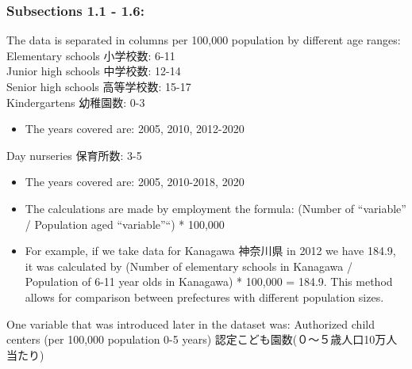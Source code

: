 \documentclass[
  12pt,
  letterpaper,
  DIV=11,
  numbers=noendperiod]{scrartcl}
\providecommand{\tightlist}{%
  \setlength{\itemsep}{0pt}\setlength{\parskip}{0pt}}\usepackage{longtable,booktabs,array}
\begin{document}
\hypertarget{subsections-1.1---1.6}{%
\subsubsection{Subsections 1.1 - 1.6:}\label{subsections-1.1---1.6}}

The data is separated in columns per 100,000 population by different age
ranges:\\
Elementary schools 小学校数: 6-11\\
Junior high schools 中学校数: 12-14\\
Senior high schools 高等学校数: 15-17\\
Kindergartens 幼稚園数: 0-3\\

\begin{itemize}
\tightlist
\item
  The years covered are: 2005, 2010, 2012-2020
\end{itemize}

Day nurseries 保育所数: 3-5\\

\begin{itemize}
\item
  The years covered are: 2005, 2010-2018, 2020
\item
  The calculations are made by employment the formula: (Number of
  ``variable'' / Population aged ``variable''``) * 100,000
\item
  For example, if we take data for Kanagawa 神奈川県 in 2012 we have
  184.9, it was calculated by (Number of elementary schools in Kanagawa
  / Population of 6-11 year olds in Kanagawa) * 100,000 = 184.9. This
  method allows for comparison between prefectures with different
  population sizes.
\end{itemize}

One variable that was introduced later in the dataset was: Authorized
child centers (per 100,000 population 0-5 years)
認定こども園数(０～５歳人口10万人当たり)\\
\end{document}
